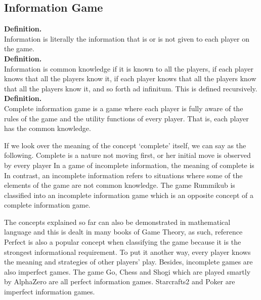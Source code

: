 \documentclass[11pt]{article}
\begin{document}
	\subsection{Information Game}
	\textbf{Definition.}\\
	Information is literally the information that is or is not given to each player on the game.\\	
	\textbf{Definition.}\\
	Information is common knowledge if it is known to all the players, if each player knows that all the players know it, if each player knows that all the players know that all the players know it, and so forth ad infinitum. This is defined recursively.\\
	\textbf{Definition.}\\
	Complete information game is a game where each player is fully aware of the rules of the game and the utility functions of every player.
	That is, each player has the common knowledge.
	
	If we look over the meaning of the concept `complete' itself, we can say as the following. Complete is a nature not moving first, or her initial move is observed by every player
	In a game of incomplete information, the meaning of complete is %
	In contrast, an incomplete information refers to situations where some of the elements of the game are not common knowledge.
	The game Rummikub is classified into an incomplete information game which is an opposite concept of a complete information game.
	
	
	The concepts explained so far can also be demonstrated in mathematical language and this is dealt in many books of Game Theory, as such, reference~~%
	Perfect is also a popular concept when classifying the game because it is the strongest informational requirement. To put it another way, every player knows the meaning and strategies of other players' play. Besides, incomplete games are also imperfect games. The game Go, Chess and Shogi which are played smartly by AlphaZero are all perfect information games. Starcrafts2 and Poker are imperfect information games.
	
\end{document}
